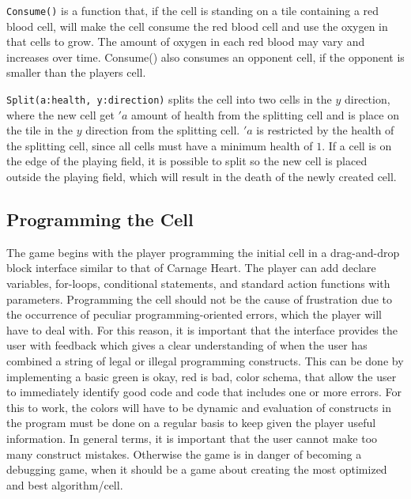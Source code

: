 \verb|Consume()| is a function that, if the cell is standing on a tile containing a red blood cell, will make the cell consume the red blood cell and use the oxygen in that cells to grow.
The amount of oxygen in each red blood may vary and increases over time.
Consume() also consumes an opponent cell, if the opponent is smaller than the players cell.\newline


\verb|Split(a:health, y:direction)| splits the cell into two cells in the $y$ direction, where the new cell get $'a$ amount of health from the splitting cell and is place on the tile in the $y$ direction from the splitting cell.
$'a$ is restricted by the health of the splitting cell, since all cells must have a minimum health of $1$.
If a cell is on the edge of the playing field, it is possible to split so the new cell is placed outside the playing field, which will result in the death of the newly created cell.

\subsection{Programming the Cell}

The game begins with the player programming the initial cell in a drag-and-drop block interface similar to that of Carnage Heart.
The player can add declare variables, for-loops, conditional statements, and standard action functions with parameters.
Programming the cell should not be the cause of frustration due to the occurrence of peculiar programming-oriented errors, which the player will have to deal with.
For this reason, it is important that the interface provides the user with feedback which gives a clear understanding of when the user has combined a string of legal or illegal programming constructs.
This can be done by implementing a basic green is okay, red is bad, color schema, that allow the user to immediately identify good code and code that includes one or more errors.
For this to work, the colors will have to be dynamic and evaluation of constructs in the program must be done on a regular basis to keep given the player useful information. 
In general terms, it is important that the user cannot make too many construct mistakes.
Otherwise the game is in danger of becoming a debugging game, when it should be a game about creating the most optimized and best algorithm/cell.

